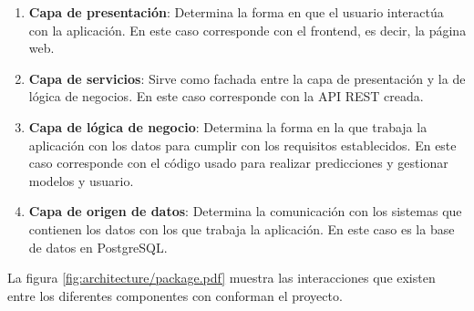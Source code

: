 \begin{enumerate}
    \item \textbf{Capa de presentación}: Determina la forma en que el usuario
    interactúa con la aplicación. En este caso corresponde con el frontend, es
    decir, la página web.
    \item \textbf{Capa de servicios}: Sirve como fachada entre la capa de
    presentación y la de lógica de negocios. En este caso corresponde con la API
    REST creada.
    \item \textbf{Capa de lógica de negocio}: Determina la forma en la que
    trabaja la aplicación con los datos para cumplir con los requisitos
    establecidos. En este caso corresponde con el código usado para realizar
    predicciones y gestionar modelos y usuario.
    \item \textbf{Capa de origen de datos}: Determina la comunicación con los
    sistemas que contienen los datos con los que trabaja la aplicación. En este
    caso es la base de datos en PostgreSQL.
\end{enumerate}

La figura \ref{fig:architecture/package.pdf} muestra las interacciones que
existen entre los diferentes componentes con conforman el proyecto.


